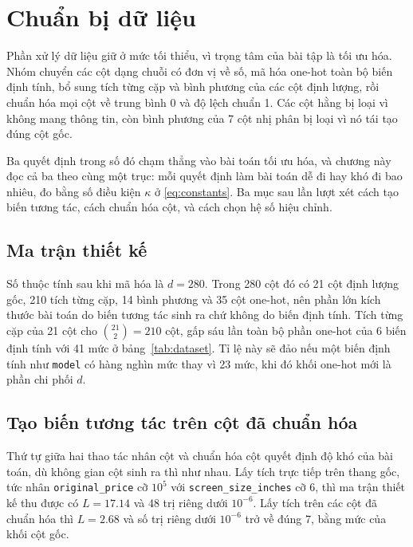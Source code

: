 \chapter{Chuẩn bị dữ liệu}
\label{sec:data}

Phần xử lý dữ liệu giữ ở mức tối thiểu, vì trọng tâm của bài tập là tối ưu hóa.
Nhóm chuyển các cột dạng chuỗi có đơn vị về số, mã hóa one-hot toàn bộ biến
định tính, bổ sung tích từng cặp và bình phương của các cột định lượng, rồi
chuẩn hóa mọi cột về trung bình 0 và độ lệch chuẩn 1. Các cột hằng bị loại vì
không mang thông tin, còn bình phương của 7 cột nhị phân bị loại vì nó tái tạo
đúng cột gốc.

Ba quyết định trong số đó chạm thẳng vào bài toán tối ưu hóa, và chương này đọc
cả ba theo cùng một trục: mỗi quyết định làm bài toán dễ đi hay khó đi bao
nhiêu, đo bằng số điều kiện $\kappa$ ở \eqref{eq:constants}. Ba mục sau lần lượt
xét cách tạo biến tương tác, cách chuẩn hóa cột, và cách chọn hệ số hiệu chỉnh.

\section{Ma trận thiết kế}
\label{sec:design-matrix}

Số thuộc tính sau khi mã hóa là $d = 280$. Trong 280 cột đó có 21 cột định
lượng gốc, 210 tích từng cặp, 14 bình phương và 35 cột one-hot, nên phần lớn
kích thước bài toán do biến tương tác sinh ra chứ không do biến định tính. Tích
từng cặp của 21 cột cho $\binom{21}{2} = 210$ cột, gấp sáu lần toàn bộ phần
one-hot của 6 biến định tính với 41 mức ở bảng~\ref{tab:dataset}. Tỉ lệ này sẽ
đảo nếu một biến định tính như \texttt{model} có hàng nghìn mức thay vì 23 mức,
khi đó khối one-hot mới là phần chi phối $d$.

\section{Tạo biến tương tác trên cột đã chuẩn hóa}
\label{sec:interaction}

Thứ tự giữa hai thao tác nhân cột và chuẩn hóa cột quyết định độ khó của bài
toán, dù không gian cột sinh ra thì như nhau. Lấy tích trực tiếp trên thang
gốc, tức nhân \texttt{original\_price} cỡ $10^{5}$ với
\texttt{screen\_size\_inches} cỡ 6, thì ma trận thiết kế thu được có
$L = \num{17.14}$ và 48 trị riêng dưới $10^{-6}$. Lấy tích trên các cột đã
chuẩn hóa thì $L = \num{2.68}$ và số trị riêng dưới $10^{-6}$ trở về đúng 7,
bằng mức của khối cột gốc.

